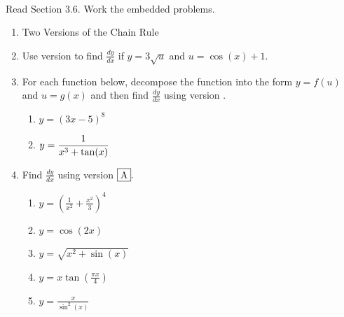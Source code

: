\documentclass[11pt,fleqn]{article}
\begin{document}
\renewcommand{\headrulewidth}{0pt}
\newcommand{\blank}[1]{\rule{#1}{0.75pt}}
\newcommand{\bc}{\begin{center}}
\newcommand{\ec}{\end{center}}
\renewcommand{\d}{\displaystyle}

\vspace*{-0.7in}

\begin{center}
  \large
  \\
\end{center}
Read Section 3.6. Work the embedded problems. \\
\begin{enumerate}
\item Two Versions of the Chain Rule
\vspace{2in}
\item Use version  to find $\frac{dy}{dx}$ if $y=3 \sqrt{u}$ and $u=\cos(x)+1.$\\
\vfill
\item For each function below, decompose the function into the form $y=f(u)$ and $u=g(x)$ and then find $\frac{dy}{dx}$ using version .
	\begin{enumerate}
	\item $y=(3x-5)^8$
	\vfill
	\item $y=\displaystyle{\large{\frac{1}{x^3+\tan(x)}}}$
	\vfill
	\end{enumerate}
	\newpage
	
\item Find $\frac{dy}{dx}$ using version $\fbox{A}.$
	\begin{enumerate}
	\item $y=(\frac{1}{x^2}+\frac{x^2}{3})^4$
	\vfill
	\item $y= \cos(2x)$
	\vfill
	\item $y=\sqrt{x^2+\sin(x)}$
	\vfill
	\item $y=x\tan(\frac{\pi x}{4})$
	\vfill
	\item $y=\frac{x}{\sin^2(x)}$
	\vfill
	\end{enumerate}
\end{enumerate}
\end{document}
